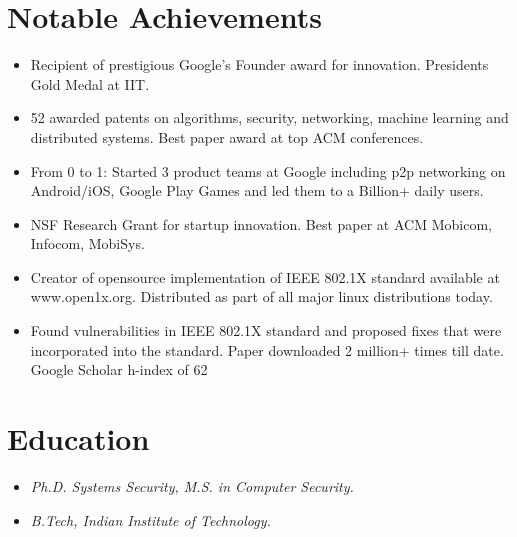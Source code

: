 \documentclass[letterpaper,9pt]{article}
\newcommand{\resumeItem}[1]{
  \item\small{
    {#1 \vspace{-2pt}}
  }
}
\begin{document}
\section{Notable Achievements}
    \begin{itemize}[leftmargin=3.5em, itemsep=0pt, label=\tiny$\bullet$]
     \resumeItem {Recipient of prestigious Google’s Founder award for innovation. Presidents Gold Medal at IIT.}
     \resumeItem {52 awarded patents on algorithms, security, networking, machine learning and distributed systems. Best paper award at top ACM conferences.}
     \resumeItem {From 0 to 1: Started 3 product teams at Google including p2p networking on Android/iOS, Google Play Games and led them to a Billion+ daily users.}
     \resumeItem {NSF Research Grant for startup innovation. Best paper at ACM Mobicom, Infocom, MobiSys.}
     \resumeItem {Creator of opensource implementation of IEEE 802.1X standard available at www.open1x.org. Distributed as part of all major linux distributions today.}
     \resumeItem {Found vulnerabilities in IEEE 802.1X standard and proposed fixes that were incorporated into the standard. Paper downloaded 2 million+ times till date. Google Scholar h-index of 62}
   \end{itemize}


\section{Education}
  \begin{itemize}
    \item[] \textit{\small Ph.D. Systems Security, M.S. in Computer Security.}
    \item[] \textit{\small B.Tech, Indian Institute of Technology.}\hspace{2pt}{\small Guwahati, India}
  \end{itemize}
\end{document}
